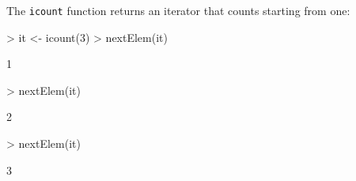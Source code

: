 \documentclass[12pt]{article}
\begin{document}
The \texttt{icount} function returns an iterator that counts starting from one:
\begin{Schunk}
\begin{Sinput}
> it <- icount(3)
> nextElem(it)
\end{Sinput}
\begin{Soutput}
[1] 1
\end{Soutput}
\begin{Sinput}
> nextElem(it)
\end{Sinput}
\begin{Soutput}
[1] 2
\end{Soutput}
\begin{Sinput}
> nextElem(it)
\end{Sinput}
\begin{Soutput}
[1] 3
\end{Soutput}
\end{Schunk}
\end{document}
